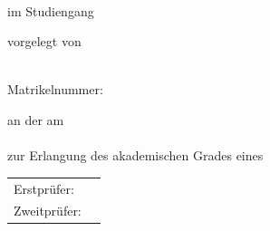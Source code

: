 
\begin{center}
	\begin{Large}
		\textbf{\VARtyp}\\
		im Studiengang {\VARstudiengang}
	\end{Large}
	\vskip 1.5cm
	\begin{Huge}
		{\VARtitel}
	\end{Huge}
	\vskip 1.5cm
	\begin{Large}
		vorgelegt von \\
		\vskip 1.5cm
		
		\textbf {\VARname}\\
			Matrikelnummer: {\VARmatrikelnummer}
		
		\vskip 1.5cm
		an der {\VARhochschule} am \\
		{\VARabgabedatum} \\
		zur Erlangung des akademischen Grades eines {\VARabschlussbezeichnung}
		
		\vskip 2cm
		
		\begin{tabular}{ll}
			Erstprüfer: & {\VARerstbetreuung}\\ 
			Zweitprüfer: & {\VARzweitbetreuung}
		\end{tabular}
		
	\end{Large}
	
\end{center}
\vfill





